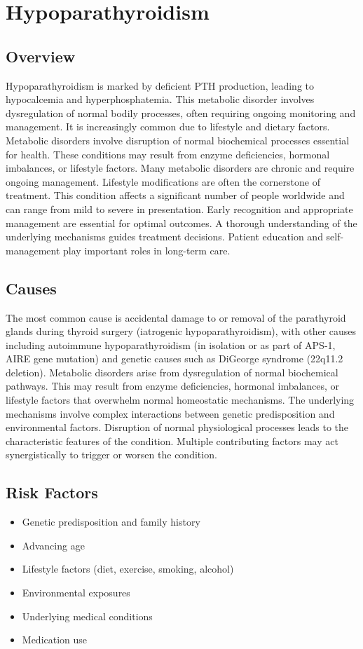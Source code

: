 \chapter{Hypoparathyroidism}
\label{sec:Hypoparathyroidism}

\section{Overview}
Hypoparathyroidism is marked by deficient PTH production, leading to hypocalcemia and hyperphosphatemia. This metabolic disorder involves dysregulation of normal bodily processes, often requiring ongoing monitoring and management. It is increasingly common due to lifestyle and dietary factors. Metabolic disorders involve disruption of normal biochemical processes essential for health. These conditions may result from enzyme deficiencies, hormonal imbalances, or lifestyle factors. Many metabolic disorders are chronic and require ongoing management. Lifestyle modifications are often the cornerstone of treatment. This condition affects a significant number of people worldwide and can range from mild to severe in presentation. Early recognition and appropriate management are essential for optimal outcomes. A thorough understanding of the underlying mechanisms guides treatment decisions. Patient education and self-management play important roles in long-term care.
\section{Causes}
The most common cause is accidental damage to or removal of the parathyroid glands during thyroid surgery (iatrogenic hypoparathyroidism), with other causes including autoimmune hypoparathyroidism (in isolation or as part of APS-1, AIRE gene mutation) and genetic causes such as DiGeorge syndrome (22q11.2 deletion). Metabolic disorders arise from dysregulation of normal biochemical pathways. This may result from enzyme deficiencies, hormonal imbalances, or lifestyle factors that overwhelm normal homeostatic mechanisms. The underlying mechanisms involve complex interactions between genetic predisposition and environmental factors. Disruption of normal physiological processes leads to the characteristic features of the condition. Multiple contributing factors may act synergistically to trigger or worsen the condition.
\section{Risk Factors}
\begin{itemize}[noitemsep]
  \item Genetic predisposition and family history
  \item Advancing age
  \item Lifestyle factors (diet, exercise, smoking, alcohol)
  \item Environmental exposures
  \item Underlying medical conditions
  \item Medication use
\end{itemize}
